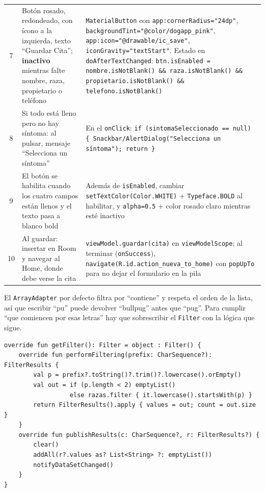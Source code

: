 \documentclass[11pt,letterpaper]{article}
\newcommand{\code}[1]{\texttt{\small #1}}
\begin{document}
\begin{center}
\begin{xltabular}{\linewidth}{@{}c X X@{}}
7 & Bot\'on rosado, redondeado, con \'icono a la izquierda, texto ``Guardar Cita''; \textbf{inactivo} mientras falte nombre, raza, propietario o tel\'efono & \code{MaterialButton} con \code{app:cornerRadius=\allowbreak{}"24dp"}, \code{backgroundTint=\allowbreak{}"@color/\allowbreak{}dogapp\_pink"}, \code{app:icon="@drawable/\allowbreak{}ic\_save"}, \code{iconGravity=\allowbreak{}"textStart"}. Estado en \code{doAfterTextChanged}: \code{btn.isEnabled =\allowbreak{} nombre.\allowbreak{}isNotBlank(\allowbreak{}) \&\& raza.\allowbreak{}isNotBlank(\allowbreak{}) \&\& propietario.\allowbreak{}isNotBlank(\allowbreak{}) \&\& telefono.\allowbreak{}isNotBlank(\allowbreak{})}\\
8 & Si todo est\'a lleno pero no hay s\'intoma: al pulsar, mensaje ``Selecciona un s\'intoma'' & En el \code{onClick}: \code{if (sintomaSeleccionado =\allowbreak{}= null) \{ Snackbar/\allowbreak{}AlertDialog(\allowbreak{}"Selecciona un s\'intoma"); return \}}\\
9 & El bot\'on se habilita cuando los cuatro campos est\'an llenos y el texto pasa a blanco bold & Adem\'as de \code{isEnabled}, cambiar \code{setTextColor(\allowbreak{}Color.WHITE)} + \code{Typeface.\allowbreak{}BOLD} al habilitar, y \code{alpha=0.5} + color rosado claro mientras est\'e inactivo\\
10 & Al guardar: insertar en Room y navegar al Home, donde debe verse la cita & \code{viewModel.\allowbreak{}guardar(\allowbreak{}cita)} en \code{viewModelScope}; al terminar (\code{onSuccess}), \code{navigate(\allowbreak{}R.id.action\_nueva\_to\_home)} con \code{popUpTo} para no dejar el formulario en la pila\\
\end{xltabular}
\end{center}

\begin{notabox}
El \code{ArrayAdapter} por defecto filtra por ``contiene'' y respeta el orden de
la lista, as\'i que escribir ``pu'' puede devolver ``bullpug'' antes que ``pug''.
Para cumplir ``que comiencen por esas letras'' hay que sobrescribir el
\code{Filter} con la l\'ogica que sigue.
\end{notabox}

\begin{verbatim}
override fun getFilter(): Filter = object : Filter() {
    override fun performFiltering(prefix: CharSequence?): FilterResults {
        val p = prefix?.toString()?.trim()?.lowercase().orEmpty()
        val out = if (p.length < 2) emptyList()
                  else razas.filter { it.lowercase().startsWith(p) }
        return FilterResults().apply { values = out; count = out.size }
    }
    override fun publishResults(c: CharSequence?, r: FilterResults?) {
        clear()
        addAll(r?.values as? List<String> ?: emptyList())
        notifyDataSetChanged()
    }
}
\end{verbatim}
\end{document}
